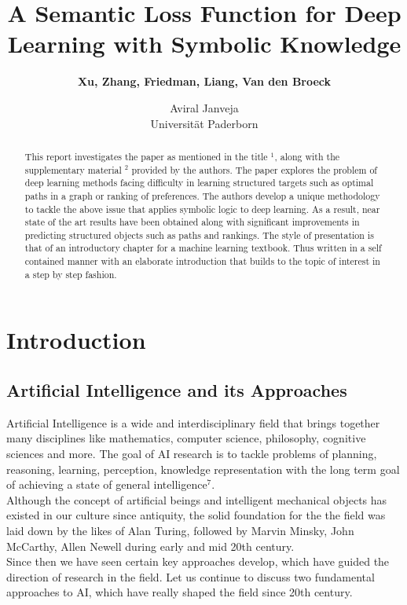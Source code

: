 \documentclass[12pt]{article}
\title{\textbf{A Semantic Loss Function for Deep Learning with Symbolic Knowledge}}
\author{\textbf{Xu, Zhang, Friedman, Liang, Van den Broeck}}
\date{Aviral Janveja\\ Universit\"{a}t Paderborn}
\begin{document}
\maketitle

\begin{abstract}
This report investigates the paper as mentioned in the title $^1$, along with the supplementary material $^2$ provided by the authors. The paper explores the problem of deep learning methods facing difficulty in learning structured targets such as optimal paths in a graph or ranking of preferences. The authors develop a unique methodology to tackle the above issue that applies symbolic logic to deep learning. As a result, near state of the art results have been obtained along with significant improvements in predicting structured objects such as paths and rankings. The style of presentation is that of an introductory chapter for a machine learning textbook. Thus written in a self contained manner with an elaborate introduction that builds to the topic of interest in a step by step fashion. 
\end{abstract}

\section{Introduction}

\subsection{Artificial Intelligence and its Approaches}
Artificial Intelligence is a wide and interdisciplinary field that brings together many disciplines like mathematics, computer science, philosophy, cognitive sciences and more. The goal of AI research is to tackle problems of planning, reasoning, learning, perception, knowledge representation with the long term goal of achieving a state of general intelligence$^7$.\\   
Although the concept of artificial beings and intelligent mechanical objects has existed in our culture since antiquity, the solid foundation for the the field was laid down by the likes of Alan Turing, followed by Marvin Minsky, John McCarthy, Allen Newell during early and mid 20th century.\\
Since then we have seen certain key approaches develop, which have guided the direction of research in the field. Let us continue to discuss two fundamental approaches to AI, which have really shaped the field since 20th century.
\end{document}

